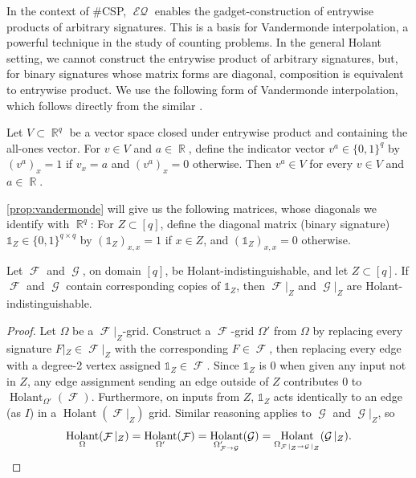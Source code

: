 \documentclass{theoretics}
\DeclareMathOperator{\rr}{\mathbb{R}}
\DeclareMathOperator{\fc}{\mathcal{F}}
\DeclareMathOperator{\gc}{\mathcal{G}}
\DeclareMathOperator{\holant}{Holant}
\DeclareMathOperator{\eq}{\mathcal{EQ}}
\begin{document}
In the context of \#CSP, $\eq$ enables the gadget-construction of entrywise 
products of arbitrary signatures. This is a basis for Vandermonde interpolation, a powerful 
technique in the study of counting problems.
In the general Holant setting, we cannot construct the entrywise product of arbitrary signatures,
but, for binary signatures whose matrix forms are diagonal, composition is equivalent to entrywise
product. We use the following form of Vandermonde interpolation, which follows directly from the similar
\cite[Lemma 2.3]{grohe_homomorphism_2022}.
\begin{proposition}
    \label{prop:vandermonde}
    Let $V \subset \rr^q$ be a vector space closed under entrywise product and containing the
    all-ones vector. For $v \in V$ and $a \in \rr$, define the indicator vector $v^a \in \{0,1\}^q$ by
    $(v^a)_x = 1$ if $v_x = a$ and $(v^a)_x = 0$ otherwise. Then $v^a \in V$ for every
    $v \in V$ and $a \in \rr$.
\end{proposition}
\autoref{prop:vandermonde} will give us the following matrices, whose diagonals we identify
with $\rr^q$:
For $Z \subset [q]$, define the diagonal matrix (binary signature)
$\mathds{1}_Z \in \{0,1\}^{q \times q}$ by $(\mathds{1}_Z)_{x,x} = 1$ if $x \in Z$, and $(\mathds{1}_Z)_{x,x} = 0$ otherwise.
\begin{lemma}
    \label{lem:restriction}
    Let $\fc$ and $\gc$, on domain $[q]$, be Holant-indistinguishable, and let $Z \subset [q]$. If $\fc$ and
    $\gc$ contain corresponding copies of $\mathds{1}_Z$, then $\fc|_Z$ and $\gc|_Z$ are 
    Holant-indistinguishable.
\end{lemma}
\begin{proof}
    Let $\Omega$ be a $\fc|_Z$-grid.
    Construct a $\fc$-grid $\Omega'$ from $\Omega$ by replacing every signature
    $F|_Z \in \fc|_Z$ with the corresponding $F \in \fc$, then replacing every edge with a degree-2 vertex
    assigned 
    $\mathds{1}_Z \in \fc$. Since $\mathds{1}_Z$ is 0 when given any input not in $Z$,
    any edge assignment sending an edge outside of $Z$ contributes 0 to
    $\holant_{\Omega'}(\fc)$. Furthermore, on inputs from $Z$, $\mathds{1}_Z$ acts identically to an 
    edge (as $I$) in a $\holant(\fc|_Z)$ grid.
    Similar reasoning applies to $\gc$ and $\gc|_Z$, so
    \[
        \holant_{\Omega}(\fc|_Z) = \holant_{\Omega'}(\fc) = \holant_{\Omega'_{\fc\to\gc}}(\gc) 
        =\holant_{\Omega_{\fc|_Z\to\gc|_Z}}(\gc|_Z). \qedhere
    \]
\end{proof}
\end{document}
